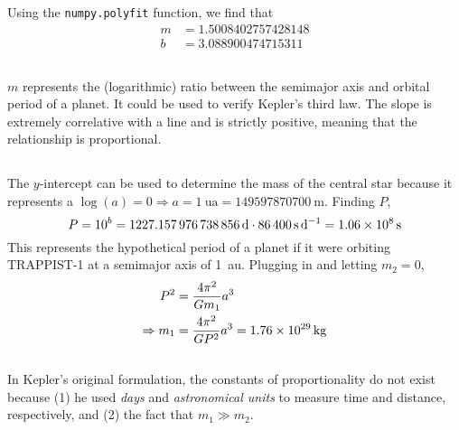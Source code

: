 \documentclass{article}
\begin{document}
\subsection{}


Using the \lstinline|numpy.polyfit| function, we find that
\begin{align}
    m &= \num{1.5008402757428148} \\
    b &= \num{3.088900474715311}
\end{align}

\subsection{}

\(m\) represents the (logarithmic) ratio between the semimajor axis and orbital period of a planet.
It could be used to verify Kepler's third law.
The slope is extremely correlative with a line and is strictly positive, meaning that the relationship is proportional.

\subsection{}

The \(y\)-intercept can be used to determine the mass of the central star because it represents a \(\log(a) = 0 \Rightarrow a = \SI{1}{\astronomicalunit} = \SI{149597870700}{\meter}\).
Finding \(P\),
\begin{equation}
    P = 10^b = \SI{1227.157976738856}{\day} \cdot \SI{86400}{\second\per\day} = \SI{1.06d8}{\second}
\end{equation}
This represents the hypothetical period of a planet if it were orbiting TRAPPIST-1 at a semimajor axis of \SI{1}{\astronomicalunit}.
Plugging in and letting \(m_2 = 0\),
\begin{align}
    P^2 &= \frac{4 \pi^2}{G m_1}a^3 \\
    \Rightarrow m_1 &= \frac{4 \pi^2}{G P^2}a^3 = \SI{1.76d29}{\kilogram}
\end{align}

\subsection{}

In Kepler's original formulation, the constants of proportionality do not exist because (1) he used \emph{days} and \emph{astronomical units} to measure time and distance, respectively, and (2) the fact that \(m_1 \gg m_2\).
\end{document}
